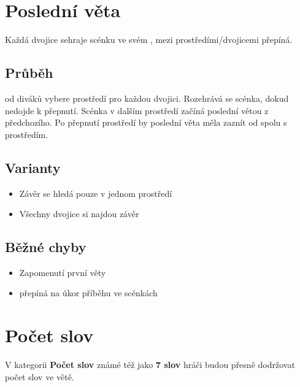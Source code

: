 \documentclass[main.tex]{subfiles}
\begin{document}
 
 
 
 
\needspace{5cm} \section{Poslední věta} \label{poslední věta}  
 
 
Každá dvojice sehraje scénku ve svém ,  mezi prostředími/dvojicemi přepíná. 
 
 
\subsection{Průběh}  od diváků vybere prostředí pro každou dvojici. Rozehrává se scénka, dokud nedojde k přepnutí. Scénka v dalším prostředí začíná poslední větou z předchozího. Po přepnutí prostředí by poslední věta měla zaznít od  spolu s prostředím. 
 
\subsection{ Varianty } \begin{itemize}
\item Závěr se hledá pouze v jednom prostředí
\item Všechny dvojice si najdou závěr
\end{itemize}
 
\subsection{ Běžné chyby } \begin{itemize}
\item Zapomenutí první věty
\item {} přepíná na úkor příběhu ve scénkách
\end{itemize}
 
 
 
 
 
\needspace{5cm} \section{Počet slov} \label{počet slov}  
 
 
V kategorii \textbf{Počet slov}{} známé též jako \textbf{7 slov}{} hráči  budou přesně dodržovat počet slov ve větě. 
\end{document}
